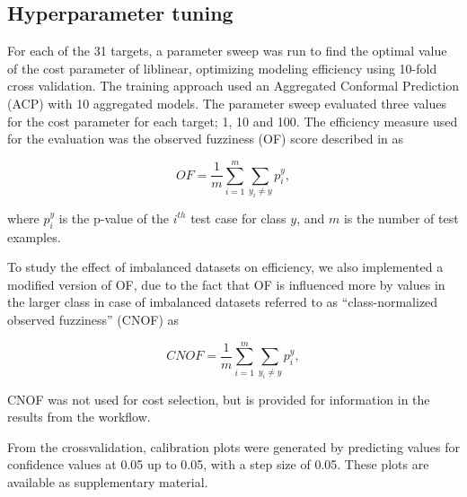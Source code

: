 \documentclass[utf8]{frontiersSCNS} %
\newcommand{\todoil}[1]{\todo[inline]{#1}}
\begin{document}
\subsection{Hyperparameter tuning}

For each of the 31 targets, a parameter sweep was run to find the optimal value of the
cost parameter of liblinear, optimizing modeling efficiency using 10-fold cross validation. The training
approach used an Aggregated Conformal Prediction (ACP) with 10 aggregated models.
The parameter sweep evaluated three values for the cost parameter for each target; 1, 10 and 100. The
efficiency measure used for the evaluation was the observed fuzziness (OF)
score described in \cite{Vovk2016} as

\begin{equation}
OF =\frac{ 1}{m} \sum\limits_{i=1}^{m} \sum\limits_{y_i \neq y }  p_i^y,		
\end{equation}

where $p_i^y$ is the p-value of the $i^{th}$ test case for class $y$, and $m$ is the number of test examples.

To study the effect of imbalanced datasets on efficiency, we also implemented a modified version of OF, due to the fact that OF is influenced more
by values in the larger class in case of imbalanced datasets referred to as ``class-normalized
observed fuzziness'' (CNOF) as

\begin{equation}
CNOF =\frac{ 1}{m} \sum\limits_{i=1}^{m} \sum\limits_{y_i \neq y }  p_i^y,		
\end{equation}

\todoil{Adapt EQ2 for CNOF}




CNOF was not used for cost selection, but is provided for information in the results from the workflow.

From the crossvalidation, calibration plots were generated by predicting values
for confidence values at 0.05 up to 0.05, with a step size of 0.05. These plots
are available as supplementary material.
\end{document}

